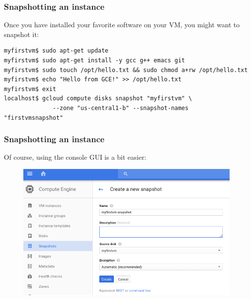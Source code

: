 \documentclass[9pt]{beamer}
\begin{document}
\begin{frame}[fragile]
  \frametitle{Snapshotting an instance}
  Once you have installed your favorite software on your VM, you might want to snapshot it:
  \begin{verbatim}
myfirstvm$ sudo apt-get update
myfirstvm$ sudo apt-get install -y gcc g++ emacs git
myfirstvm$ sudo touch /opt/hello.txt && sudo chmod a+rw /opt/hello.txt
myfirstvm$ echo "Hello from GCE!" >> /opt/hello.txt
myfirstvm$ exit
localhost$ gcloud compute disks snapshot "myfirstvm" \
              --zone "us-central1-b" --snapshot-names "firstvmsnapshot"
  \end{verbatim}  
\end{frame}

\begin{frame}[fragile]
  \frametitle{Snapshotting an instance}
  Of course, using the console GUI is a bit easier:
  \begin{figure}
    \includegraphics[scale=0.3]{figures/SnapshotVM.png}
  \end{figure}
\end{frame}
\end{document}
